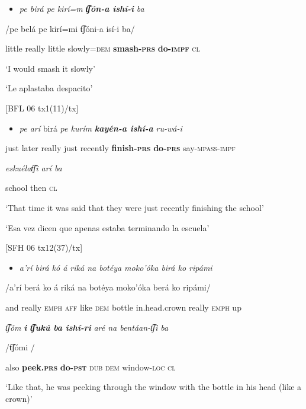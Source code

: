 \begin{itemize}
\item \textit{pe      birá      pe   kirí=m} \textbf{\textit{t͡ʃón-a   ishí-i} } \textit{ba}
\end{itemize}

/pe  belá  pe  kirí=mi  t͡ʃóni-a    isí-i    ba/  

little   really  little  slowly=\textsc{dem} \textbf{smash-\textsc{prs}} \textbf{do-\textsc{impf}} \textsc{cl}

  ‘I would smash it slowly’  

  ‘Le aplastaba despacito’

  [BFL 06 tx1(11)/tx]

\begin{itemize}
\item \textit{pe   arí}   birá  \textit{pe   kurím} \textbf{\textit{kayén-a   ishí-a}} \textit{ru-wá-i}    
\end{itemize}

  just  later  really  just  recently  \textbf{finish-\textsc{prs}} \textbf{do-\textsc{prs}} say\textsc{{}-mpass-impf}

\textit{eskuélat͡ʃi   arí   ba}

  school    then  \textsc{cl}

‘That time it was said that they were just recently finishing the school’

‘Esa vez dicen que apenas estaba terminando la escuela’

  [SFH 06 tx12(37)/tx]

\begin{itemize}
\item \textit{a’rí   birá   kó  á  riká   na   botéya   moko’óka   birá   ko   ripámi}   
\end{itemize}

/a’rí  berá  ko  á  riká  na  botéya  moko’óka  berá  ko  ripámi/  

and  really  \textsc{emph  aff} like  \textsc{dem} bottle  in.head.crown  really  \textsc{emph} up

\textit{t͡ʃóm} \textbf{\textit{i  t͡ʃukú  ba   ishí-ri}} \textit{aré   na   bentáan-t͡ʃi   ba}

/t͡ʃómi    /  

  also \textbf{peek.\textsc{prs}} \textbf{do-\textsc{pst}} \textsc{dub  dem} window-\textsc{loc  cl}

‘Like that, he was peeking through the window with the bottle in his head (like a crown)’

